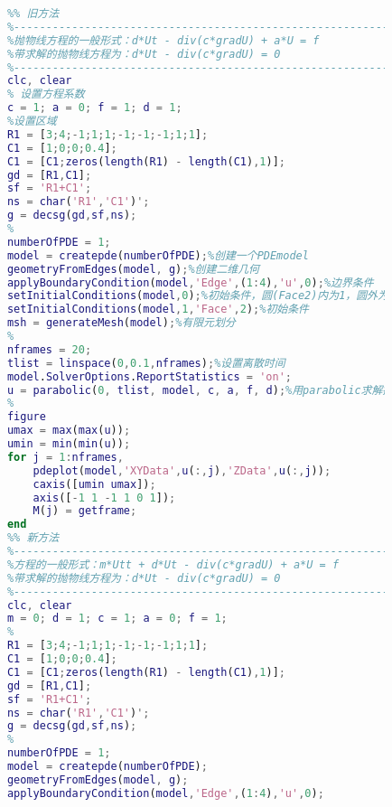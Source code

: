             \begin{lstlisting}[language = Matlab]
            %%%%%%%%%%%%%%% 示例3：金属板的热传导问题 %%%%%%%%%%%%%%%%
            %% 旧方法
            %-------------------------------------------------------------------
            %抛物线方程的一般形式：d*Ut - div(c*gradU) + a*U = f
            %带求解的抛物线方程为：d*Ut - div(c*gradU) = 0
            %-------------------------------------------------------------------
            clc, clear
            % 设置方程系数
            c = 1; a = 0; f = 1; d = 1;
            %设置区域
            R1 = [3;4;-1;1;1;-1;-1;-1;1;1];
            C1 = [1;0;0;0.4];
            C1 = [C1;zeros(length(R1) - length(C1),1)];
            gd = [R1,C1];
            sf = 'R1+C1';
            ns = char('R1','C1')';
            g = decsg(gd,sf,ns);
            %
            numberOfPDE = 1;
            model = createpde(numberOfPDE);%创建一个PDEmodel
            geometryFromEdges(model, g);%创建二维几何
            applyBoundaryCondition(model,'Edge',(1:4),'u',0);%边界条件
            setInitialConditions(model,0);%初始条件，圆(Face2)内为1，圆外为0。
            setInitialConditions(model,1,'Face',2);%初始条件
            msh = generateMesh(model);%有限元划分
            %
            nframes = 20;
            tlist = linspace(0,0.1,nframes);%设置离散时间
            model.SolverOptions.ReportStatistics = 'on';
            u = parabolic(0, tlist, model, c, a, f, d);%用parabolic求解抛物型方程
            %
            figure
            umax = max(max(u));
            umin = min(min(u));
            for j = 1:nframes,
                pdeplot(model,'XYData',u(:,j),'ZData',u(:,j));
                caxis([umin umax]);
                axis([-1 1 -1 1 0 1]);
                M(j) = getframe;
            end
            %% 新方法
            %-------------------------------------------------------------------
            %方程的一般形式：m*Utt + d*Ut - div(c*gradU) + a*U = f
            %带求解的抛物线方程为：d*Ut - div(c*gradU) = 0
            %-------------------------------------------------------------------
            clc, clear
            m = 0; d = 1; c = 1; a = 0; f = 1;
            %
            R1 = [3;4;-1;1;1;-1;-1;-1;1;1];
            C1 = [1;0;0;0.4];
            C1 = [C1;zeros(length(R1) - length(C1),1)];
            gd = [R1,C1];
            sf = 'R1+C1';
            ns = char('R1','C1')';
            g = decsg(gd,sf,ns);
            %
            numberOfPDE = 1;
            model = createpde(numberOfPDE);
            geometryFromEdges(model, g);
            applyBoundaryCondition(model,'Edge',(1:4),'u',0);

\end{lstlisting}

